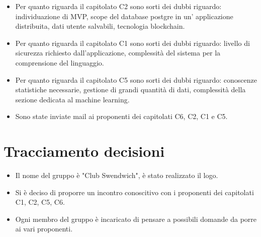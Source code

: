 \begin{itemize}
    \item Per quanto riguarda il capitolato C2 sono sorti dei dubbi riguardo: individuazione di MVP, scope del database postgre in un' applicazione distribuita, dati utente salvabili, tecnologia blockchain.
    \item Per quanto riguarda il capitolato C1 sono sorti dei dubbi riguardo: livello di sicurezza richiesto dall'applicazione, complessità del sistema per la comprensione del linguaggio.
    \item Per quanto riguarda il capitolato C5 sono sorti dei dubbi riguardo: conoscenze statistiche necessarie, gestione di grandi quantità di dati, complessità della sezione dedicata al machine learning.
    \item Sono state inviate mail ai proponenti dei capitolati C6, C2, C1 e C5.
\end{itemize}
\section{Tracciamento decisioni}
\begin{itemize}
    \item Il nome del gruppo è "Club Swendwich", è stato realizzato il logo.
    \item Si è deciso di proporre un incontro conoscitivo con i proponenti dei capitolati C1, C2, C5, C6.
    \item Ogni membro del gruppo è incaricato di pensare a possibili domande da porre ai vari proponenti.
\end{itemize}